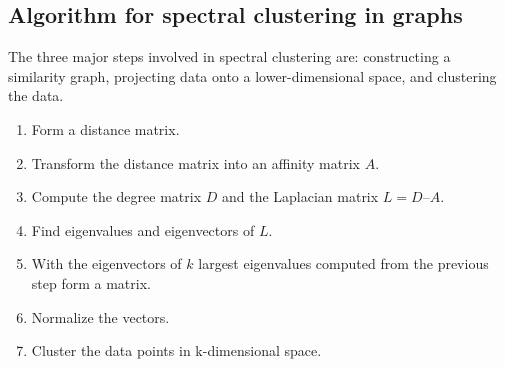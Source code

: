 \documentclass{article}
\begin{document}
    \subsection{Algorithm for spectral clustering in graphs}
    The three major steps involved in spectral clustering are: constructing a similarity graph, projecting data onto a lower-dimensional space, and clustering the data. 
        \begin{enumerate}[label=\textbf{Step \arabic*:}, wide=0pt, leftmargin=!, itemindent=2em]
            \item Form a distance matrix.
            \item Transform the distance matrix into an affinity matrix $A$.
            \item Compute the degree matrix $D$ and the Laplacian matrix $L = D – A$.
            \item Find eigenvalues and eigenvectors of $L$.
            \item With the eigenvectors of $k$ largest eigenvalues computed from the previous step form a matrix.
            \item Normalize the vectors.
            \item Cluster the data points in k-dimensional space.
        \end{enumerate}
    
\end{document}
